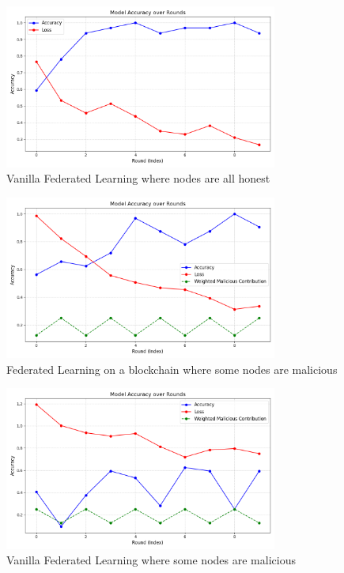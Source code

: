 \begin{figure}
  \centering
  \includegraphics[width=0.8\textwidth]{figures/ml/honest-vfl.png}
  \caption{Vanilla Federated Learning where nodes are all honest}
  \label{fig:honest-vfl}
\end{figure}

\begin{figure}
  \centering
  \includegraphics[width=0.8\textwidth]{figures/ml/malicious-bfl.png}
  \caption{Federated Learning on a blockchain where some nodes are malicious}
  \label{fig:malicious-bfl}
\end{figure}

\begin{figure}
  \centering
  \includegraphics[width=0.8\textwidth]{figures/ml/malicious-vfl.png}
  \caption{Vanilla Federated Learning where some nodes are malicious}
  \label{fig:malicious-vfl}
\end{figure}
